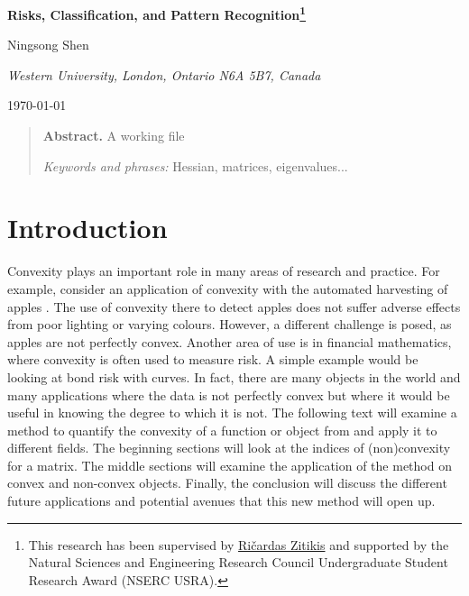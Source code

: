 \documentclass[12pt]{article}
\numberwithin{equation}{section}
\numberwithin{figure}{section}
\numberwithin{table}{section}
\theoremstyle{definition}
\theoremstyle{remark}
\numberwithin{equation}{section}
\begin{document}
\begin{center}


{\Large\bf Risks, Classification, and Pattern Recognition\footnote{This research has been supervised by \href{http://fisher.stats.uwo.ca/faculty/zitikis/main.htm}{Ri\v cardas Zitikis} and supported by the Natural Sciences and Engineering Research Council Undergraduate Student Research Award (NSERC USRA).}}


\vspace*{7mm}

{\large Ningsong Shen}

\medskip

\textit{Western University, London, Ontario N6A 5B7, Canada}

\bigskip

\today

\end{center}



\begin{quote}
\textbf{Abstract.} A working file


\textit{Keywords and phrases:} Hessian, matrices, eigenvalues...


\end{quote}



\section{Introduction}
\label{introduction}

Convexity plays an important role in many areas of research and practice. For example, consider an application of convexity with the automated harvesting of apples \citep{KL2014}. The use of convexity there to detect apples does not suffer adverse effects from poor lighting or varying colours. However, a different challenge is posed, as apples are not perfectly convex. Another area of use is in financial mathematics, where convexity is often used to measure risk. A simple example would be looking at bond risk with curves. In fact, there are many objects in the world and many applications where the data is not perfectly convex but where it would be useful in knowing the degree to which it is not. The following text will examine a method to quantify the convexity of a function or object from \cite{DMZ2019} and apply it to different fields. The beginning sections will look at the indices of (non)convexity for a matrix. The middle sections will examine the application of the method on convex and non-convex objects. Finally, the conclusion will discuss the different future applications and potential avenues that this new method will open up.
\end{document}
